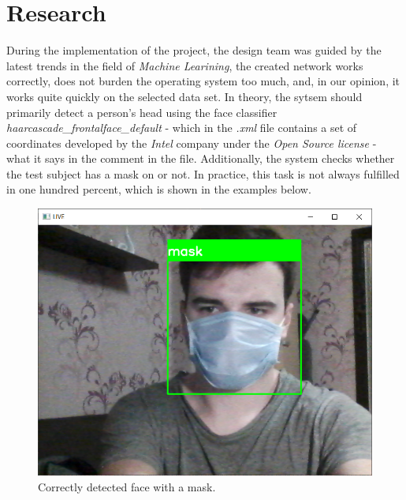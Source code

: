\documentclass[12pt,a4paper]{article}
\begin{document}
\section{Research}
During the implementation of the project, the design team was guided by the latest trends in the field of \textit{Machine Learining}, the created network works correctly, does not burden the operating system too much, and, in our opinion, it works quite quickly on the selected data set. In theory, the sytsem should primarily detect a person's head using the face classifier \textit{haarcascade\_frontalface\_default} - which in the \textit{.xml} file contains a set of coordinates developed by the \textit{Intel} company under the \textit{Open Source license} - what it says in the comment in the file. Additionally, the system checks whether the test subject has a mask on or not. In practice, this task is not always fulfilled in one hundred percent, which is shown in the examples below. 

\begin{figure}[h!]
    \centering
    \includegraphics[scale = 0.38]{media/true_z.png}
    \caption{Correctly detected face with a mask.}
    \label{fig:Rysunek1}
\end{figure}
\end{document}
